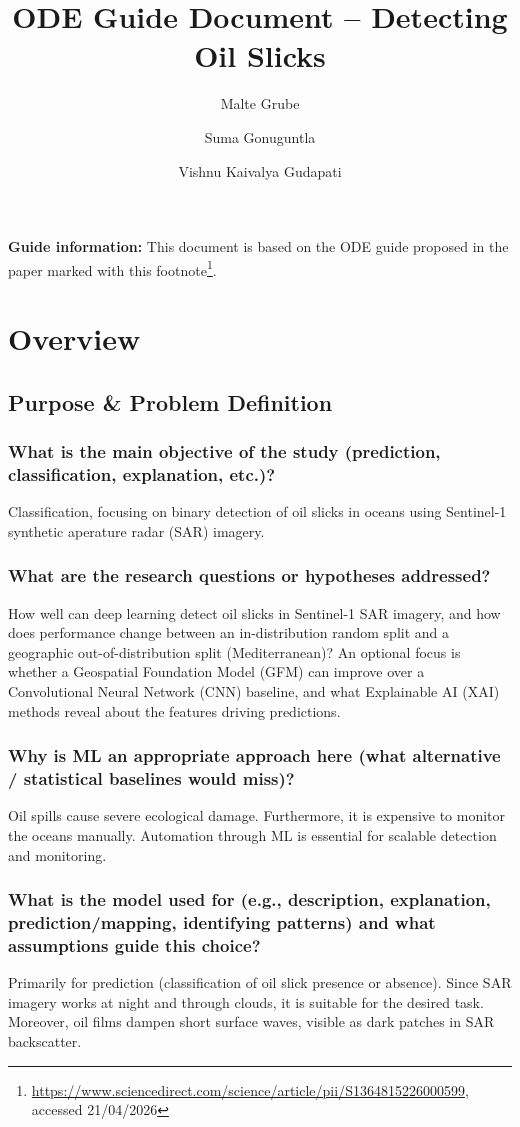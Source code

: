 \documentclass[sigconf]{acmart}
\title{ODE Guide Document -- Detecting Oil Slicks}
\author{Malte Grube}
\affiliation{
  \institution{University of Rostock}
  \city{Rostock}
  \country{Germany}
}
\author{Suma Gonuguntla}
\affiliation{
  \institution{University of Rostock}
  \city{Rostock}
  \country{Germany}
}
\author{Vishnu Kaivalya Gudapati}
\affiliation{
  \institution{University of Rostock}
  \city{Rostock}
  \country{Germany}
}
\begin{document}
\maketitle

    \textbf{Guide information:} This document is based on the ODE guide proposed in the paper marked with this footnote\footnote{\url{https://www.sciencedirect.com/science/article/pii/S1364815226000599}, accessed 21/04/2026}.

\section{Overview}

\subsection{Purpose \& Problem Definition}
\subsubsection{What is the main objective of the study (prediction, classification, explanation, etc.)?} Classification, focusing on binary detection of oil slicks in oceans using Sentinel-1 synthetic aperature radar (SAR) imagery.
\subsubsection{What are the research questions or hypotheses addressed?} How well can deep learning detect oil slicks in Sentinel-1 SAR imagery, and how does performance change between an in-distribution random split and a geographic out-of-distribution split (Mediterranean)? An optional focus is whether a Geospatial Foundation Model (GFM) can improve over a Convolutional Neural Network (CNN) baseline, and what Explainable AI (XAI) methods reveal about the features driving predictions.
\subsubsection{Why is ML an appropriate approach here (what alternative / statistical baselines would miss)?} Oil spills cause severe ecological damage. Furthermore, it is expensive to monitor the oceans manually. Automation through ML is essential for scalable detection and monitoring.
\subsubsection{What is the model used for (e.g., description, explanation, prediction/mapping, identifying patterns) and what assumptions guide this choice?} Primarily for prediction (classification of oil slick presence or absence). Since SAR imagery works at night and through clouds, it is suitable for the desired task. Moreover, oil films dampen short surface waves, visible as dark patches in SAR backscatter.
\end{document}
